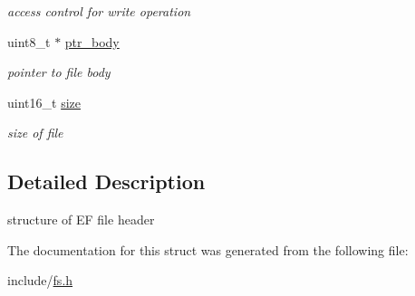 \begin{DoxyCompactItemize}
\begin{DoxyCompactList}\small\item\em access control for write operation \end{DoxyCompactList}\item 
\hypertarget{structEF__st_a1e6e1e32d3d07c55eac45ee389894215}{uint8\-\_\-t $\ast$ \hyperlink{structEF__st_a1e6e1e32d3d07c55eac45ee389894215}{ptr\-\_\-body}}\label{structEF__st_a1e6e1e32d3d07c55eac45ee389894215}

\begin{DoxyCompactList}\small\item\em pointer to file body \end{DoxyCompactList}\item 
\hypertarget{structEF__st_a4bca3be0269088500c9bb28b4eaa8952}{uint16\-\_\-t \hyperlink{structEF__st_a4bca3be0269088500c9bb28b4eaa8952}{size}}\label{structEF__st_a4bca3be0269088500c9bb28b4eaa8952}

\begin{DoxyCompactList}\small\item\em size of file \end{DoxyCompactList}\end{DoxyCompactItemize}


\subsection{Detailed Description}
structure of E\-F file header 

The documentation for this struct was generated from the following file\-:\begin{DoxyCompactItemize}
\item 
include/\hyperlink{fs_8h}{fs.\-h}\end{DoxyCompactItemize}
